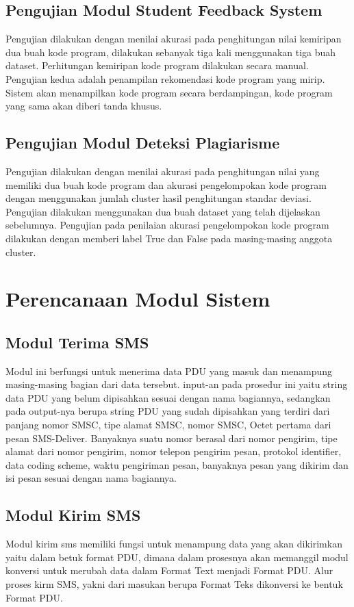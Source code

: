 \documentclass[12pt,a4paper]{article}
\begin{document}
\subsection{Pengujian Modul Student Feedback System}
Pengujian dilakukan dengan menilai akurasi pada penghitungan nilai kemiripan dua buah kode program, dilakukan sebanyak tiga kali menggunakan tiga buah dataset. Perhitungan kemiripan kode program dilakukan secara manual.
Pengujian kedua adalah penampilan rekomendasi kode program yang mirip. Sistem akan menampilkan kode program secara berdampingan, kode program yang sama akan diberi tanda khusus.
\subsection{Pengujian Modul Deteksi Plagiarisme}
Pengujian dilakukan dengan menilai akurasi pada penghitungan nilai yang memiliki dua buah kode program dan akurasi pengelompokan kode program dengan menggunakan jumlah cluster hasil penghitungan standar deviasi. Pengujian dilakukan menggunakan dua buah dataset yang telah dijelaskan sebelumnya. Pengujian pada penilaian akurasi pengelompokan kode program dilakukan dengan memberi label True dan False pada masing-masing anggota cluster. 

\section{Perencanaan Modul Sistem}
\subsection{Modul Terima SMS}
Modul ini berfungsi untuk menerima data PDU yang masuk dan menampung masing-masing bagian dari data tersebut.
input-an pada prosedur ini yaitu string data PDU yang belum dipisahkan sesuai dengan nama bagiannya, sedangkan pada output-nya
berupa string PDU yang sudah dipisahkan yang terdiri dari panjang nomor SMSC, tipe alamat
SMSC, nomor SMSC, Octet pertama dari pesan SMS-Deliver. Banyaknya suatu nomor berasal dari nomor pengirim, tipe alamat dari nomor pengirim, nomor telepon pengirim pesan, protokol identifier, data coding scheme, waktu pengiriman pesan, banyaknya
pesan yang dikirim dan isi pesan sesuai dengan nama bagiannya. 
\subsection{Modul Kirim SMS}
Modul kirim sms memiliki fungsi untuk menampung data yang akan dikirimkan yaitu dalam betuk format PDU, dimana dalam prosesnya akan memanggil modul konversi untuk merubah data dalam Format Text menjadi Format PDU. Alur proses kirm SMS, yakni dari masukan berupa Format Teks dikonversi ke bentuk Format PDU. 
\end{document}

